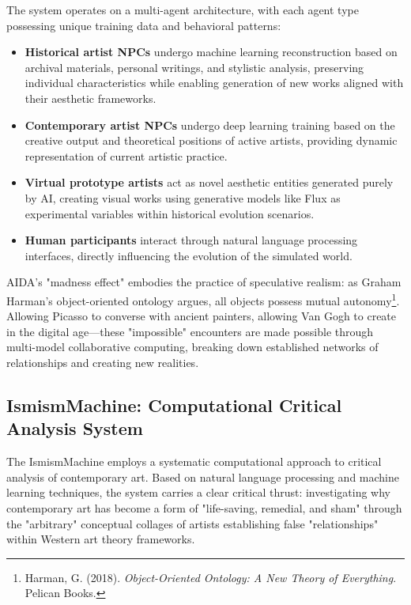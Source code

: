 \documentclass{article}
\begin{document}
The system operates on a multi-agent architecture, with each agent type possessing unique training data and behavioral patterns:

\begin{itemize}
\item \textbf{Historical artist NPCs} undergo machine learning reconstruction based on archival materials, personal writings, and stylistic analysis, preserving individual characteristics while enabling generation of new works aligned with their aesthetic frameworks.

\item \textbf{Contemporary artist NPCs} undergo deep learning training based on the creative output and theoretical positions of active artists, providing dynamic representation of current artistic practice.

\item \textbf{Virtual prototype artists} act as novel aesthetic entities generated purely by AI, creating visual works using generative models like Flux as experimental variables within historical evolution scenarios.

\item \textbf{Human participants} interact through natural language processing interfaces, directly influencing the evolution of the simulated world.
\end{itemize}

AIDA's "madness effect" embodies the practice of speculative realism: as Graham Harman's object-oriented ontology argues, all objects possess mutual autonomy\footnote{Harman, G. (2018). \textit{Object-Oriented Ontology: A New Theory of Everything}. Pelican Books.}. Allowing Picasso to converse with ancient painters, allowing Van Gogh to create in the digital age—these "impossible" encounters are made possible through multi-model collaborative computing, breaking down established networks of relationships and creating new realities.

\subsection{IsmismMachine: Computational Critical Analysis System}

The IsmismMachine employs a systematic computational approach to critical analysis of contemporary art. Based on natural language processing and machine learning techniques, the system carries a clear critical thrust: investigating why contemporary art has become a form of "life-saving, remedial, and sham" through the "arbitrary" conceptual collages of artists establishing false "relationships" within Western art theory frameworks.
\end{document}
